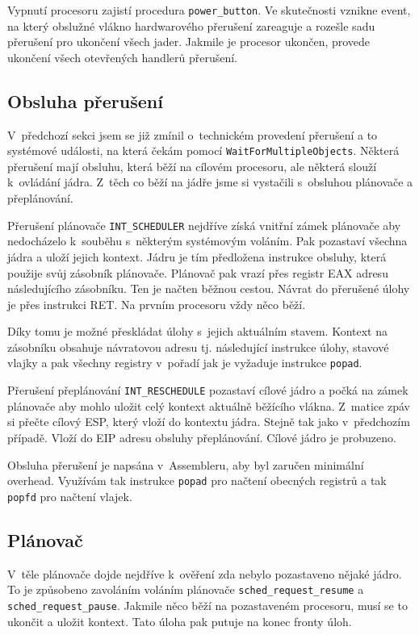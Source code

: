 \documentclass[a4paper,12pt]{article}
\begin{document}
Vypnutí procesoru zajistí procedura \verb+power_button+. Ve skutečnosti vznik\-ne event,
na který obslužné vlákno hardwarového přerušení zareaguje a rozešle sadu přerušení pro
ukončení všech jader. Jakmile je procesor ukončen, provede ukončení všech otevřených
handlerů přerušení.

\subsection{Obsluha přerušení}
V~předchozí sekci jsem se již zmínil o~technickém provedení přerušení a to systémové
události, na která čekám pomocí \verb+WaitForMultipleObjects+. Některá přerušení mají
obsluhu, která běží na cílovém procesoru, ale některá slouží k~ovládání jádra.
Z~těch co běží na jádře jsme si vystačili s~obsluhou plánovače a přeplánování.

Přerušení plánovače \verb+INT_SCHEDULER+ nejdříve získá vnitřní zámek plánovače aby
nedocházelo k~souběhu s~některým systémovým voláním. Pak pozastaví všechna jádra a uloží jejich kontext. Jádru je tím předložena instrukce obsluhy, která použije svůj zásobník plánovače.
Plánovač pak vrazí přes registr EAX adresu následujícího zásobníku. Ten je načten běžnou cestou.
Návrat do přerušené úlohy je přes instrukci RET. Na prvním procesoru vždy něco běží.

Díky tomu je možné přeskládat úlohy s~jejich aktuálním stavem. Kontext na zásobníku
obsahuje návratovou adresu tj. následující instrukce úlohy, stavové vlajky a pak všechny
registry v~pořadí jak je vyžaduje instrukce \texttt{popad}.

Přerušení přeplánování \verb+INT_RESCHEDULE+ pozastaví cílové jádro a počká na zámek
plánovače aby mohlo uložit celý kontext aktuálně běžícího vlákna. Z~matice zpáv si přečte
cílový ESP, který vloží do kontextu jádra. Stejně tak jako v~předchozím případě. Vloží
do EIP adresu obsluhy přeplánování. Cílové jádro je probuzeno.

Obsluha přerušení je napsána v~Assembleru, aby byl zaručen minimální overhead. Využívám tak
instrukce \texttt{popad} pro načtení obecných registrů a tak  \texttt{popfd} pro načtení vlajek.

\subsection{Plánovač}
V~těle plánovače dojde nejdříve k~ověření zda nebylo pozastaveno nějaké jádro. To je
způsobeno zavoláním voláním plánovače \verb+sched_request_resume+ a \verb+sched_request_pause+.
Jakmile něco běží na pozastaveném procesoru, musí se to ukončit a uložit kontext.
Tato úloha pak putuje na konec fronty úloh.
\end{document}
